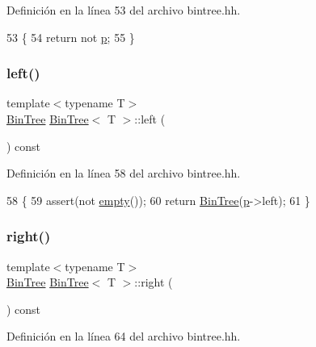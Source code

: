 Definición en la línea 53 del archivo bintree.\+hh.


\begin{DoxyCode}
53                         \{
54         \textcolor{keywordflow}{return} not \hyperlink{class_bin_tree_afe3647af1dda90f6ddf1deee6560fcf1}{p};
55     \}
\end{DoxyCode}
\mbox{\label{class_bin_tree_a82108db4c1b08d1f111027788c196d4e}} 
\subsubsection{\texorpdfstring{left()}{left()}}
{\footnotesize\ttfamily template$<$typename T$>$ \\
\hyperlink{class_bin_tree}{Bin\+Tree} \hyperlink{class_bin_tree}{Bin\+Tree}$<$ T $>$\+::left (\begin{DoxyParamCaption}{ }\end{DoxyParamCaption}) const}



Definición en la línea 58 del archivo bintree.\+hh.


\begin{DoxyCode}
58                           \{
59         assert(not \hyperlink{class_bin_tree_a74cda259ba5c25b8ee38ed4dc33e4fad}{empty}());
60         \textcolor{keywordflow}{return} \hyperlink{class_bin_tree_a47eef22d29cd023449d97c073c08e5b6}{BinTree}(\hyperlink{class_bin_tree_afe3647af1dda90f6ddf1deee6560fcf1}{p}->left);
61     \}
\end{DoxyCode}
\mbox{\label{class_bin_tree_aff8e96651b27284c329667b5ad3e4d0b}} 
\subsubsection{\texorpdfstring{right()}{right()}}
{\footnotesize\ttfamily template$<$typename T$>$ \\
\hyperlink{class_bin_tree}{Bin\+Tree} \hyperlink{class_bin_tree}{Bin\+Tree}$<$ T $>$\+::right (\begin{DoxyParamCaption}{ }\end{DoxyParamCaption}) const}



Definición en la línea 64 del archivo bintree.\+hh.


